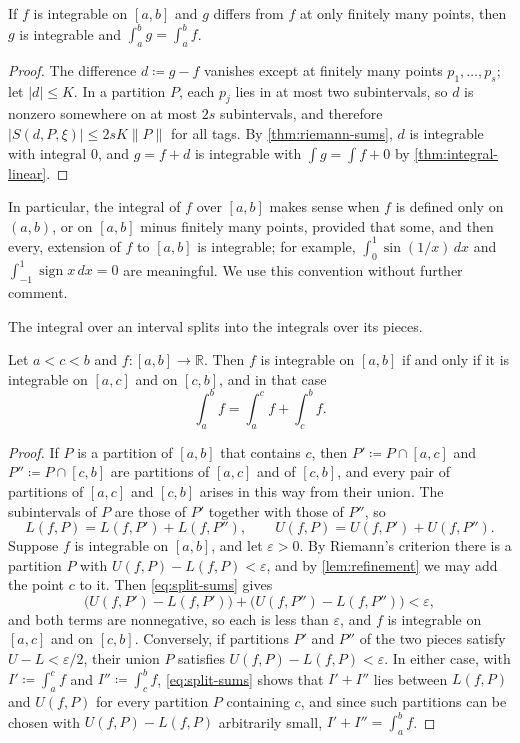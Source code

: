 \begin{corollary}
\label{cor:change-finitely-many}
If $f$ is integrable on $[a,b]$ and $g$ differs from $f$ at only finitely many points, then $g$ is integrable and $\int_a^bg=\int_a^bf$.
\end{corollary}

\begin{proof}
The difference $d\coloneqq g-f$ vanishes except at finitely many points $p_1,\ldots,p_s$; let $|d|\le K$. In a partition $P$, each $p_j$ lies in at most two subintervals, so $d$ is nonzero somewhere on at most $2s$ subintervals, and therefore $|S(d,P,\xi)|\le2sK\|P\|$ for all tags. By \cref{thm:riemann-sums}, $d$ is integrable with integral $0$, and $g=f+d$ is integrable with $\int g=\int f+0$ by \cref{thm:integral-linear}.
\end{proof}

In particular, the integral of $f$ over $[a,b]$ makes sense when $f$ is defined only on $(a,b)$, or on $[a,b]$ minus finitely many points, provided that some, and then every, extension of $f$ to $[a,b]$ is integrable; for example, $\int_0^1\sin(1/x)\,dx$ and $\int_{-1}^1\operatorname{sign}x\,dx=0$ are meaningful. We use this convention without further comment.

The integral over an interval splits into the integrals over its pieces.

\begin{theorem}
\label{thm:integral-additive}
Let $a<c<b$ and $f\colon[a,b]\to\mathbb R$. Then $f$ is integrable on $[a,b]$ if and only if it is integrable on $[a,c]$ and on $[c,b]$, and in that case
\[
\int_a^bf=\int_a^cf+\int_c^bf .
\]
\end{theorem}

\begin{proof}
If $P$ is a partition of $[a,b]$ that contains $c$, then $P'\coloneqq P\cap[a,c]$ and $P''\coloneqq P\cap[c,b]$ are partitions of $[a,c]$ and of $[c,b]$, and every pair of partitions of $[a,c]$ and $[c,b]$ arises in this way from their union. The subintervals of $P$ are those of $P'$ together with those of $P''$, so
\begin{equation}
L(f,P)=L(f,P')+L(f,P''),\qquad U(f,P)=U(f,P')+U(f,P'').
\label{eq:split-sums}
\end{equation}
Suppose $f$ is integrable on $[a,b]$, and let $\varepsilon>0$. By Riemann's criterion there is a partition $P$ with $U(f,P)-L(f,P)<\varepsilon$, and by \cref{lem:refinement} we may add the point $c$ to it. Then \eqref{eq:split-sums} gives
\[
\bigl(U(f,P')-L(f,P')\bigr)+\bigl(U(f,P'')-L(f,P'')\bigr)<\varepsilon ,
\]
and both terms are nonnegative, so each is less than $\varepsilon$, and $f$ is integrable on $[a,c]$ and on $[c,b]$. Conversely, if partitions $P'$ and $P''$ of the two pieces satisfy $U-L<\varepsilon/2$, their union $P$ satisfies $U(f,P)-L(f,P)<\varepsilon$. In either case, with $I'\coloneqq\int_a^cf$ and $I''\coloneqq\int_c^bf$, \eqref{eq:split-sums} shows that $I'+I''$ lies between $L(f,P)$ and $U(f,P)$ for every partition $P$ containing $c$, and since such partitions can be chosen with $U(f,P)-L(f,P)$ arbitrarily small, $I'+I''=\int_a^bf$.
\end{proof}

